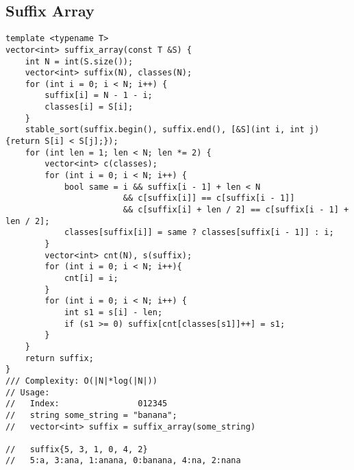 \documentclass[10pt,letterpaper,twocolumn,twosided]{article}
\begin{document}
\subsection{Suffix Array}
\begin{lstlisting}
template <typename T>
vector<int> suffix_array(const T &S) {
    int N = int(S.size());
    vector<int> suffix(N), classes(N);
    for (int i = 0; i < N; i++) {
        suffix[i] = N - 1 - i;
        classes[i] = S[i];
    }
    stable_sort(suffix.begin(), suffix.end(), [&S](int i, int j) {return S[i] < S[j];});
    for (int len = 1; len < N; len *= 2) {
        vector<int> c(classes);
        for (int i = 0; i < N; i++) {
            bool same = i && suffix[i - 1] + len < N
                        && c[suffix[i]] == c[suffix[i - 1]]
                        && c[suffix[i] + len / 2] == c[suffix[i - 1] + len / 2];
            classes[suffix[i]] = same ? classes[suffix[i - 1]] : i;
        }
        vector<int> cnt(N), s(suffix);
        for (int i = 0; i < N; i++){
            cnt[i] = i;
        }
        for (int i = 0; i < N; i++) {
            int s1 = s[i] - len;
            if (s1 >= 0) suffix[cnt[classes[s1]]++] = s1;
        }
    }
    return suffix;
}
/// Complexity: O(|N|*log(|N|))
// Usage:
//   Index:                012345 
//   string some_string = "banana";
//   vector<int> suffix = suffix_array(some_string)

//   suffix{5, 3, 1, 0, 4, 2}
//   5:a, 3:ana, 1:anana, 0:banana, 4:na, 2:nana
\end{lstlisting}
\end{document}
